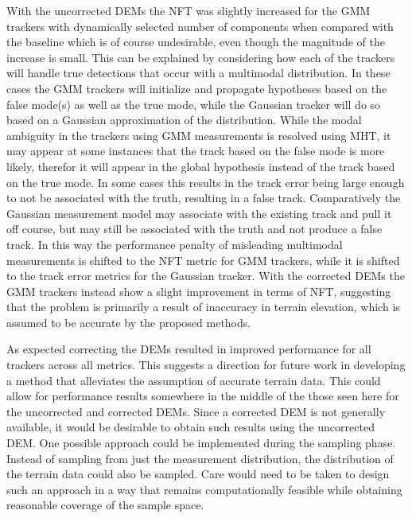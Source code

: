\documentclass[journal]{IEEEtran}
\begin{document}
With the uncorrected DEMs the NFT was slightly increased for the GMM trackers with dynamically selected number of components when compared with the baseline which is of course undesirable, even though the magnitude of the increase is small. This can be explained by considering how each of the trackers will handle true detections that occur with a multimodal distribution. In these cases the GMM trackers will initialize and propagate hypotheses based on the false mode(s) as well as the true mode, while the Gaussian tracker will do so based on a Gaussian approximation of the distribution. While the modal ambiguity in the trackers using GMM measurements is resolved using MHT, it may appear at some instances that the track based on the false mode is more likely, therefor it will appear in the global hypothesis instead of the track based on the true mode. In some cases this results in the track error being large enough to not be associated with the truth, resulting in a false track. Comparatively the Gaussian measurement model may associate with the existing track and pull it off course, but may still be associated with the truth and not produce a false track. In this way the performance penalty of misleading multimodal measurements is shifted to the NFT metric for GMM trackers, while it is shifted to the track error metrics for the Gaussian tracker. With the corrected DEMs the GMM trackers instead show a slight improvement in terms of NFT, suggesting that the problem is primarily a result of inaccuracy in terrain elevation, which is assumed to be accurate by the proposed methods.

As expected correcting the DEMs resulted in improved performance for all trackers across all metrics. This suggests a direction for future work in developing a method that alleviates the assumption of accurate terrain data. This could allow for performance results somewhere in the middle of the those seen here for the uncorrected and corrected DEMs. Since a corrected DEM is not generally available, it would be desirable to obtain such results using the uncorrected DEM. One possible approach could be implemented during the sampling phase. Instead of sampling from just the measurement distribution, the distribution of the terrain data could also be sampled. Care would need to be taken to design such an approach in a way that remains computationally feasible while obtaining reasonable coverage of the sample space.
\end{document}
